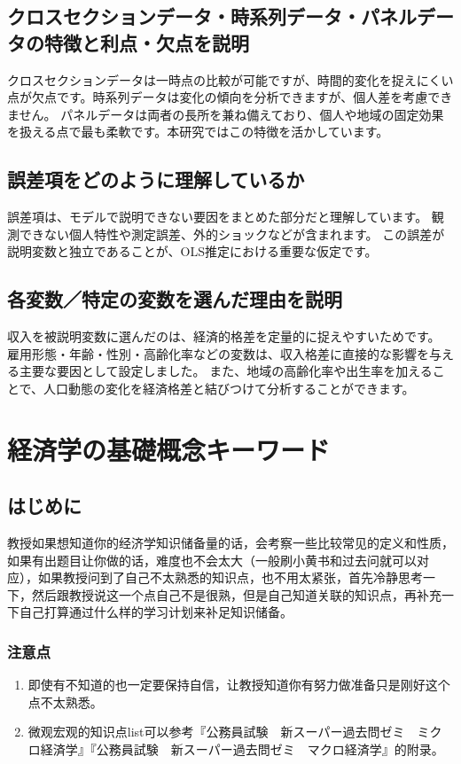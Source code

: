 \documentclass[xelatex,a4paper,base=11pt,ja=standard,jafont=noto]{bxjsreport}
\begin{document}
\section{クロスセクションデータ・時系列データ・パネルデータの特徴と利点・欠点を説明}
クロスセクションデータは一時点の比較が可能ですが、時間的変化を捉えにくい点が欠点です。時系列データは変化の傾向を分析できますが、個人差を考慮できません。
パネルデータは両者の長所を兼ね備えており、個人や地域の固定効果を扱える点で最も柔軟です。本研究ではこの特徴を活かしています。
\section{誤差項をどのように理解しているか}
誤差項は、モデルで説明できない要因をまとめた部分だと理解しています。
観測できない個人特性や測定誤差、外的ショックなどが含まれます。
この誤差が説明変数と独立であることが、OLS推定における重要な仮定です。
\section{各変数／特定の変数を選んだ理由を説明}
収入を被説明変数に選んだのは、経済的格差を定量的に捉えやすいためです。
雇用形態・年齢・性別・高齢化率などの変数は、収入格差に直接的な影響を与える主要な要因として設定しました。
また、地域の高齢化率や出生率を加えることで、人口動態の変化を経済格差と結びつけて分析することができます。

\chapter{経済学の基礎概念キーワード}
\section*{はじめに}

教授如果想知道你的经济学知识储备量的话，会考察一些比较常见的定义和性质，如果有出题目让你做的话，难度也不会太大（一般刷小黄书和过去问就可以对应），如果教授问到了自己不太熟悉的知识点，也不用太紧张，首先冷静思考一下，然后跟教授说这一个点自己不是很熟，但是自己知道关联的知识点，再补充一下自己打算通过什么样的学习计划来补足知识储备。

\subsection*{注意点}

\begin{enumerate}
\item 即使有不知道的也一定要保持自信，让教授知道你有努力做准备只是刚好这个点不太熟悉。
\item 微观宏观的知识点list可以参考『公務員試験　新スーパー過去問ゼミ　ミクロ経済学』『公務員試験　新スーパー過去問ゼミ　マクロ経済学』的附录。
\end{enumerate}
\newpage
\end{document}
